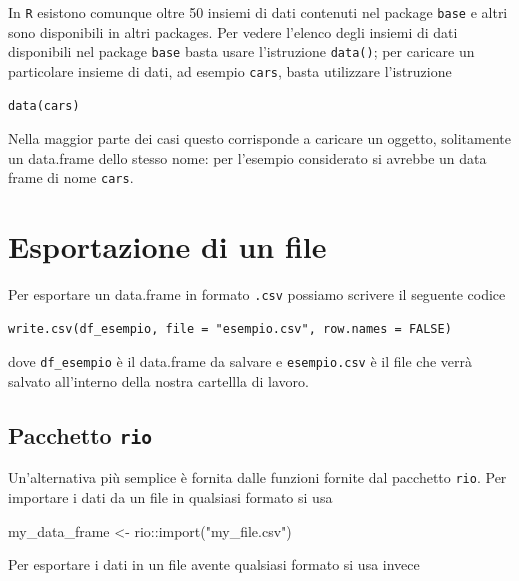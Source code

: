 \documentclass[
]{memoir}
\newenvironment{Shaded}{\begin{snugshade}}{\end{snugshade}}
\newcommand{\FunctionTok}[1]{\textcolor[rgb]{0.00,0.00,0.00}{#1}}
\newcommand{\NormalTok}[1]{#1}
\newcommand{\OtherTok}[1]{\textcolor[rgb]{0.56,0.35,0.01}{#1}}
\newcommand{\SpecialCharTok}[1]{\textcolor[rgb]{0.00,0.00,0.00}{#1}}
\newcommand{\StringTok}[1]{\textcolor[rgb]{0.31,0.60,0.02}{#1}}
\theoremstyle{definition}
\theoremstyle{definition}
\theoremstyle{definition}
\theoremstyle{definition}
\theoremstyle{remark}
\begin{document}
In \texttt{R} esistono comunque oltre 50 insiemi di dati contenuti nel package
\texttt{base} e altri sono disponibili in altri packages. Per vedere l'elenco
degli insiemi di dati disponibili nel package \texttt{base} basta usare
l'istruzione \texttt{data()}; per caricare un particolare insieme di dati, ad
esempio \texttt{cars}, basta utilizzare l'istruzione

\begin{verbatim}
data(cars)
\end{verbatim}

Nella maggior parte dei casi questo corrisponde a caricare un oggetto,
solitamente un data.frame dello stesso nome: per l'esempio considerato
si avrebbe un data frame di nome \texttt{cars}.

\hypertarget{esportazione-di-un-file}{%
\section{Esportazione di un file}\label{esportazione-di-un-file}}

Per esportare un data.frame in formato \texttt{.csv} possiamo scrivere il
seguente codice

\begin{verbatim}
write.csv(df_esempio, file = "esempio.csv", row.names = FALSE)
\end{verbatim}

dove \texttt{df\_esempio} è il data.frame da salvare e \texttt{esempio.csv} è il file
che verrà salvato all'interno della nostra cartellla di lavoro.

\hypertarget{pacchetto-rio}{%
\subsection{\texorpdfstring{Pacchetto \texttt{rio}}{Pacchetto rio}}\label{pacchetto-rio}}

Un'alternativa più semplice è fornita dalle funzioni fornite dal pacchetto \texttt{rio}. Per importare i dati da un file in qualsiasi formato si usa

\begin{Shaded}
\begin{Highlighting}[]
\NormalTok{my\_data\_frame }\OtherTok{\textless{}{-}}\NormalTok{ rio}\SpecialCharTok{::}\FunctionTok{import}\NormalTok{(}\StringTok{"my\_file.csv"}\NormalTok{)}
\end{Highlighting}
\end{Shaded}

Per esportare i dati in un file avente qualsiasi formato si usa invece
\end{document}
